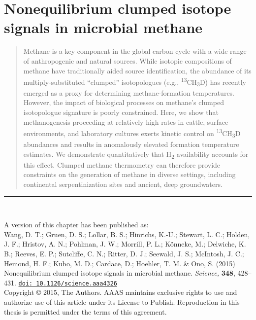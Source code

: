 \chapter{Nonequilibrium clumped isotope signals in microbial methane}
\label{ch:2}




\begin{abstract}
	\noindent Methane is a key component in the global carbon cycle with a wide range
	of anthropogenic and natural sources. While isotopic compositions of
	methane have traditionally aided source identification, the abundance of
	its multiply-substituted ``clumped'' isotopologues (e.g.,
	\textsuperscript{13}CH\textsubscript{3}D) has recently emerged as
	a proxy for determining methane-formation temperatures. However, the
	impact of biological processes on methane's clumped isotopologue
	signature is poorly constrained. Here, we show that methanogenesis
	proceeding at relatively high rates in cattle, surface environments, and
	laboratory cultures exerts kinetic control on
	\textsuperscript{13}CH\textsubscript{3}D abundances and results in
	anomalously elevated formation temperature estimates. We demonstrate
	quantitatively that H\textsubscript{2} availability accounts for this
	effect. Clumped methane thermometry can therefore provide
	constraints on the generation of methane in diverse settings, including
	continental serpentinization sites and ancient, deep groundwaters.
\end{abstract}

\vspace*{\fill}

\noindent \rule{\textwidth}{0.4pt}\\

{\small
	
	\noindent A version of this chapter has been published as:\\
	
	\noindent Wang, D. T.; Gruen, D. S.; Lollar, B. S.; Hinrichs, K.-U.; Stewart, L. C.; Holden, J. F.; Hristov, A. N.; Pohlman, J. W.; Morrill, P. L.; Könneke, M.; Delwiche, K. B.; Reeves, E. P.; Sutcliffe, C. N.; Ritter, D. J.; Seewald, J. S.; McIntosh, J. C.; Hemond, H. F.; Kubo, M. D.; Cardace, D.; Hoehler, T. M. \& Ono, S. (2015) Nonequilibrium clumped isotope signals in microbial methane. \emph{Science,} \textbf{348}, 428--431.  \href{http://dx.doi.org/10.1126/science.aaa4326}{\nolinkurl{doi: 10.1126/science.aaa4326}}\\
	
	\noindent Copyright © 2015, The Authors.  AAAS maintains exclusive rights to use and authorize use of this article under its License to Publish.  Reproduction in this thesis is permitted under the terms of this agreement.
	
}

